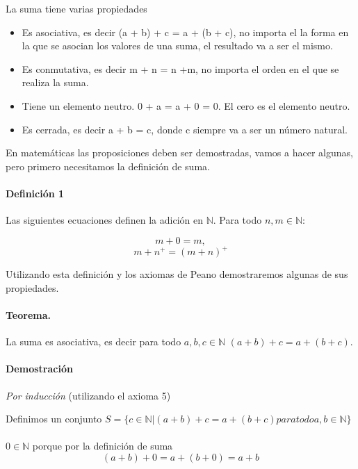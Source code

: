 \documentclass{article}
\begin{document}
La suma tiene varias propiedades

\begin{itemize}
    \item Es asociativa, es decir (a + b) + c = a + (b + c), no importa el la forma en la que se asocian los valores de una suma, el resultado va a ser el mismo.
    \item Es conmutativa, es decir m + n = n +m, no importa el orden en el que se realiza la suma.
    \item Tiene un elemento neutro.  0 + a = a + 0 = 0. El cero es el elemento neutro.
    \item Es cerrada, es decir a + b = c, donde c siempre va a ser un número natural.
\end{itemize}

En matemáticas las proposiciones deben ser demostradas, vamos a hacer algunas, pero primero necesitamos la definición de suma.

\paragraph{Definición 1}\cite{tnumprincip_2004}\label{def:sum} Las siguientes ecuaciones definen la adición en $\mathbb{N}$. Para todo $n,m \in \mathbb{N}$:

$$m + 0 = m,$$
$$m + n^+ = (m + n)^+$$

Utilizando esta definición y los axiomas de Peano demostraremos algunas de sus propiedades.

\paragraph{Teorema.} La suma es asociativa, es decir para todo $a,b,c \in \mathbb{N}$ $(a + b) + c = a + (b + c)$.

\paragraph{Demostración} \textit{Por inducción} (utilizando el axioma 5)

Definimos un conjunto $S = \{c \in \mathbb{N} | (a + b) + c = a + (b + c) para todo a,b \in \mathbb{N}\}$

\paragraph{} $0 \in \mathbb{N}$ porque por la definición de suma
$$ (a + b) + 0 = a + (b + 0) = a + b$$
\end{document}
